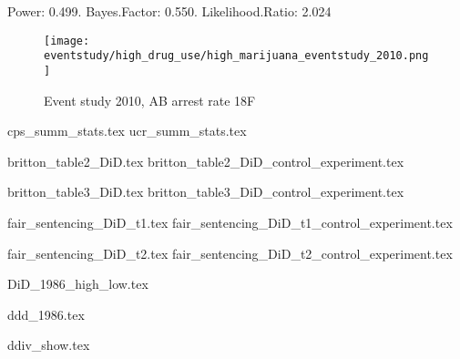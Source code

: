 \documentclass{article}
\begin{document}
Power: 0.499. Bayes.Factor: 0.550.  Likelihood.Ratio: 2.024

\clearpage

\begin{figure}[h]
  \caption{Event study 2010, AB arrest rate 18F}
  \centering
  \texttt{[image: eventstudy/high\_drug\_use/high\_marijuana\_eventstudy\_2010.png]}
  \label{fig:TBD}
\end{figure}

\clearpage



{cps_summ_stats.tex}
{ucr_summ_stats.tex}


{britton_table2_DiD.tex}
{britton_table2_DiD_control_experiment.tex}

{britton_table3_DiD.tex}
{britton_table3_DiD_control_experiment.tex}

{fair_sentencing_DiD_t1.tex}
{fair_sentencing_DiD_t1_control_experiment.tex}

{fair_sentencing_DiD_t2.tex}
{fair_sentencing_DiD_t2_control_experiment.tex}

{DiD_1986_high_low.tex}

{ddd_1986.tex}

{ddiv_show.tex}
\end{document}
